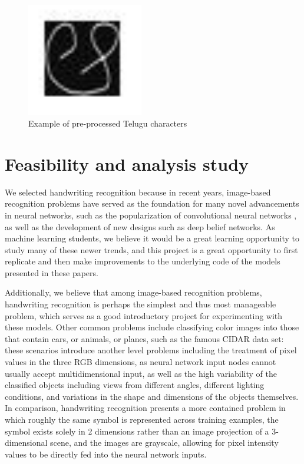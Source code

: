 \documentclass[12pt]{article}  %
\begin{document}
\begin{figure}[htb]
\label{tel}
\begin{center}
\includegraphics[width=2in]{telugu.png}
\caption{Example of pre-processed Telugu characters}
\label{tel}
\end{center}
\end{figure} 

\section{Feasibility and analysis study}
\label{Feasibility and analysis study}
We selected handwriting recognition because in recent years, image-based recognition problems have served as the foundation for many novel advancements in neural networks, such as the popularization of convolutional neural networks \cite{website1}, as well as the development of new designs such as deep belief networks. As machine learning students, we believe it would be a great learning opportunity to study many of these newer trends, and this project is a great opportunity to first replicate and then make improvements to the underlying code of the models presented in these papers.

Additionally, we believe that among image-based recognition problems, handwriting recognition is perhaps the simplest and thus most manageable problem, which serves as a good introductory project for experimenting with these models. Other common problems include classifying color images into those that contain cars, or animals, or planes, such as the famous CIDAR data set: these scenarios introduce another level problems including the treatment of pixel values in the three RGB dimensions, as neural network input nodes cannot usually accept multidimensional input, as well as the high variability of the classified objects including views from different angles, different lighting conditions, and variations in the shape and dimensions of the objects themselves. In comparison, handwriting recognition presents a more contained problem in which roughly the same symbol is represented across training examples, the symbol exists solely in 2 dimensions rather than an image projection of a 3-dimensional scene, and the images are grayscale, allowing for pixel intensity values to be directly fed into the neural network inputs.
\end{document}
